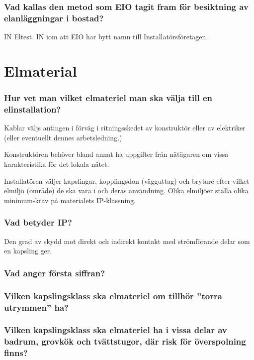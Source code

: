 \documentclass[a4paper,swedish]{article}
\begin{document}
\setcounter{section}{68}
\section{Vad kallas den metod som EIO tagit fram för besiktning av elanläggningar i bostad?}

IN Eltest. IN iom att EIO har bytt namn till Installatörsföretagen.

\part{Elmaterial}

\setcounter{section}{0}
\section{Hur vet man vilket elmateriel man ska välja till en elinstallation?}

Kablar väljs antingen i förväg i ritningsskedet av konstruktör eller av
elektriker (eller eventuellt dennes arbetsledning.)

Konstruktören behöver bland annat ha uppgifter från nätägaren om vissa karakteristika
för det lokala nätet.

Installatören väljer kapslingar, kopplingsdon (vägguttag) och brytare efter vilket elmiljö (område)
de ska vara i och deras användning. Olika elmiljöer ställa olika minimum-krav på materialets IP-klassning.

\setcounter{section}{2}
\section{Vad betyder IP?}

Den grad av skydd mot direkt och indirekt kontakt med strömförande delar som en kapsling ger.

\setcounter{section}{4}
\section{Vad anger första siffran?}

\setcounter{section}{6}
\section{Vilken kapslingsklass ska elmateriel om tillhör ”torra utrymmen” ha?}

\setcounter{section}{8}
\section{Vilken kapslingsklass ska elmateriel ha i vissa delar av badrum, grovkök och
  tvättstugor, där risk för överspolning finns?}
\end{document}
